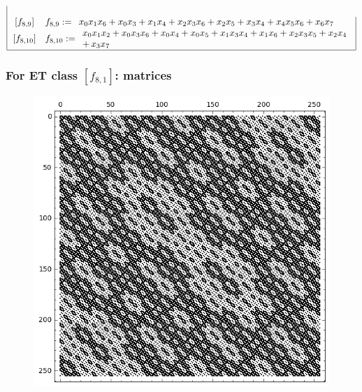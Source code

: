 \documentclass[pdf,sprung,slideColor,nocolorBG]{beamer}
\newenvironment{colortheme}[1]{
\def\ProvidesPackageRCS $##1${\relax}
\renewcommand{\ProcessOptions}{\relax}
\makeatletter

\makeatother
}{}
\begin{document}
\begin{colortheme}{jubata}
\begin{frame}
\begin{align*}
\begin{array}{|cl|}
\begin{array}{l}
\end{array}
\\
\,[f_{ 8 , 9 }] & f_{ 8 , 9 } :=
\begin{array}{l}
x_{0} x_{1} x_{6} + x_{0} x_{3} + x_{1} x_{4} + x_{2} x_{3} x_{6} + x_{2} x_{5} + x_{3} x_{4} + x_{4} x_{5} x_{6} + x_{6} x_{7}
\end{array}
\\
\,[f_{ 8 , 10 }] & f_{ 8 , 10 } :=
\begin{array}{l}
x_{0} x_{1} x_{2} + x_{0} x_{3} x_{6} + x_{0} x_{4} + x_{0} x_{5} + x_{1} x_{3} x_{4} + x_{1} x_{6} + x_{2} x_{3} x_{5} + x_{2} x_{4} 
\\
+\,  x_{3} x_{7}
\end{array}
\\
\hline
\end{array}
\end{align*}
\normalsize{}
\end{frame}
\begin{frame}
\frametitle{For ET class $[f_{8,1}]$: matrices}
\begin{figure}
\centering
\begin{minipage}{.48\textwidth}
  \centering
  \includegraphics[width=.9\linewidth]{../matrix_plot/re8_1_weight_class_matrix.png}
  \label{fig:8_1_weight_class_matrix}
\end{minipage}%
\begin{minipage}{.48\textwidth}

\end{minipage}
\end{figure}
\end{frame}
\end{colortheme}
\end{document}

